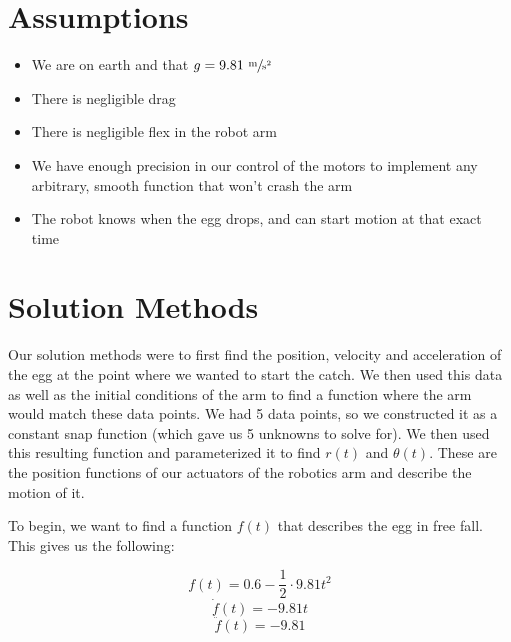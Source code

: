 \documentclass[nofoot,pdf-a,balance,colorlinks,upint,subscriptcorrection,varvw,mathalfa=cal=boondoxo]{asmeconf}
\begin{document}
		\section*{Assumptions}
	
	\begin{itemize}
        \item We are on earth and that $g = 9.81 \textrm{ }\sfrac{\textrm{m}}{\textrm{s}^2}$
		\item There is negligible drag
		\item There is negligible flex in the robot arm
        \item We have enough precision in our control of the motors to implement any arbitrary, smooth function that won't crash the arm
		\item The robot knows when the egg drops, and can start motion at that exact time
	\end{itemize}

	\section*{Solution Methods}
	
		Our solution methods were to first find the position, velocity and acceleration of the egg at the point where we wanted to start the catch. We then used this data as well as the initial conditions of the arm to find a function where the arm would match these data points. We had 5 data points, so we constructed it as a constant snap function (which gave us 5 unknowns to solve for). We then used this resulting function and parameterized it to find $r\left(t\right)$ and $\theta\left(t\right)$. These are the position functions of our actuators of the robotics arm and describe the motion of it.\newline

        To begin, we want to find a function $f\left(t\right)$ that describes the egg in free fall. This gives us the following:

        \begin{equation}
            f\left(t\right) = 0.6 - \frac{1}{2} \cdot 9.81 t^2
        \end{equation}
        \begin{equation}
            \dot{f}\left(t\right) = - 9.81 t
        \end{equation}
        \begin{equation}
            \ddot{f}\left(t\right) = - 9.81
        \end{equation}
\end{document}
